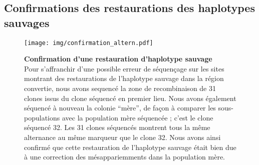 \subsection{Confirmations des restaurations des haplotypes sauvages}
\label{subsec:confirm-haplotype}

\begin{figure}
  \centering
  \texttt{[image: img/confirmation\_altern.pdf]}
  \caption[Confirmation des restaurations]{\label{fig:confirm-haplotype}
    \textbf{Confirmation d'une restauration d'haplotype sauvage} \\
    \rmfamily Pour s'affranchir d'une possible erreur de séquençage sur les
    sites montrant des restaurations de l'haplotype sauvage dans la région
    convertie, nous avons sequencé la zone de recombinaison de 31 clones issus
    du clone séquencé en premier lieu. Nous avons également séquencé à nouveau
    la colonie ``mère'', de façon à comparer les sous-populations avec la
    population mère séquencée ; c'est le clone séquencé \num{32}.
    Les 31 clones séquencés montrent tous la même alternance au même marqueur
    que le clone 32. Nous avons ainsi confirmé que cette restauration de
    l'haplotype sauvage était bien due à une correction des mésappariemments
    dans la population mère. }
\end{figure}




